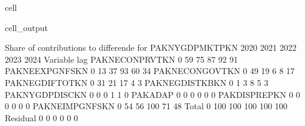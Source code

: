 \documentclass[letterpaper,10pt,english]{jupyterBook}
\begin{document}
\begin{sphinxuseclass}{cell}
\begin{sphinxVerbatimOutput}
\begin{sphinxuseclass}{cell_output}
\begin{sphinxVerbatim}[commandchars=\\\{\}]
 Share of contributions to differende for  PAKNYGDPMKTPKN
                          2020        2021        2022        2023        2024
Variable       lag                                                            
PAKNECONPRVTKN 0           59\PYGZpc{}         75\PYGZpc{}         87\PYGZpc{}         92\PYGZpc{}         91\PYGZpc{}
PAKNEEXPGNFSKN 0           13\PYGZpc{}         37\PYGZpc{}         93\PYGZpc{}         60\PYGZpc{}         34\PYGZpc{}
PAKNECONGOVTKN 0           49\PYGZpc{}         19\PYGZpc{}         \PYGZhy{}6\PYGZpc{}          8\PYGZpc{}         17\PYGZpc{}
PAKNEGDIFTOTKN 0           31\PYGZpc{}         21\PYGZpc{}         17\PYGZpc{}          4\PYGZpc{}          3\PYGZpc{}
PAKNEGDISTKBKN 0            1\PYGZpc{}          3\PYGZpc{}          8\PYGZpc{}          5\PYGZpc{}          3\PYGZpc{}
PAKNYGDPDISCKN 0            0\PYGZpc{}          0\PYGZpc{}          1\PYGZpc{}          1\PYGZpc{}          0\PYGZpc{}
PAKADAP        0           \PYGZhy{}0\PYGZpc{}         \PYGZhy{}0\PYGZpc{}         \PYGZhy{}0\PYGZpc{}         \PYGZhy{}0\PYGZpc{}         \PYGZhy{}0\PYGZpc{}
PAKDISPREPKN   0           \PYGZhy{}0\PYGZpc{}         \PYGZhy{}0\PYGZpc{}         \PYGZhy{}0\PYGZpc{}         \PYGZhy{}0\PYGZpc{}         \PYGZhy{}0\PYGZpc{}
PAKNEIMPGNFSKN 0          \PYGZhy{}54\PYGZpc{}        \PYGZhy{}56\PYGZpc{}       \PYGZhy{}100\PYGZpc{}        \PYGZhy{}71\PYGZpc{}        \PYGZhy{}48\PYGZpc{}
Total          0          100\PYGZpc{}        100\PYGZpc{}        100\PYGZpc{}        100\PYGZpc{}        100\PYGZpc{}
Residual       0           \PYGZhy{}0\PYGZpc{}         \PYGZhy{}0\PYGZpc{}         \PYGZhy{}0\PYGZpc{}         \PYGZhy{}0\PYGZpc{}         \PYGZhy{}0\PYGZpc{}


\end{sphinxVerbatim}
\end{sphinxuseclass}
\end{sphinxVerbatimOutput}
\end{sphinxuseclass}
\end{document}
